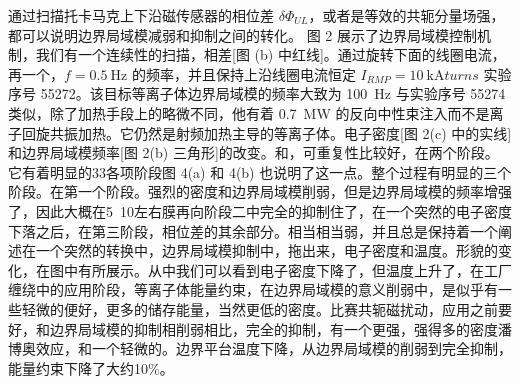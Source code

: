 通过扫描托卡马克上下沿磁传感器的相位差 $\delta\Phi_{UL}$，或者是等效的共轭分量场强，都可以说明边界局域模减弱和抑制之间的转化。
图 2 展示了边界局域模控制机制，我们有一个连续性的扫描，相差[图 (b) 中红线]。通过旋转下面的线圈电流，再一个，$f=\SI{0.5}{\hertz}$ 的频率，并且保持上沿线圈电流恒定 $I_{RMP}= \SI{10}{\kilo\ampere turns}$ 实验序号 55272。该目标等离子体边界局域模的频率大致为 \SI{100}{\hertz} 与实验序号 55274 类似，除了加热手段上的略微不同，他有着 \SI{0.7}{\mega\watt} 的反向中性束注入而不是离子回旋共振加热。它仍然是射频加热主导的等离子体。电子密度[图 2(c) 中的实线]和边界局域模频率[图 2(b) 三角形]的改变。和，可重复性比较好，在两个阶段。它有着明显的33各项阶段图 4(a) 和 4(b) 也说明了这一点。整个过程有明显的三个阶段。在第一个阶段。强烈的密度和边界局域模削弱，但是边界局域模的频率增强了，因此大概在5~10左右膜再向阶段二中完全的抑制住了，在一个突然的电子密度下落之后，在第三阶段，相位差的其余部分。相当相当弱，并且总是保持着一个阐述在一个突然的转换中，边界局域模抑制中，拖出来，电子密度和温度。形貌的变化，在图中有所展示。从中我们可以看到电子密度下降了，但温度上升了，在工厂缠绕中的应用阶段，等离子体能量约束，在边界局域模的意义削弱中，是似乎有一些轻微的便好，更多的储存能量，当然更低的密度。比赛共轭磁扰动，应用之前要好，和边界局域模的抑制相削弱相比，完全的抑制，有一个更强，强得多的密度潘博奥效应，和一个轻微的。边界平台温度下降，从边界局域模的削弱到完全抑制，能量约束下降了大约10\%。

